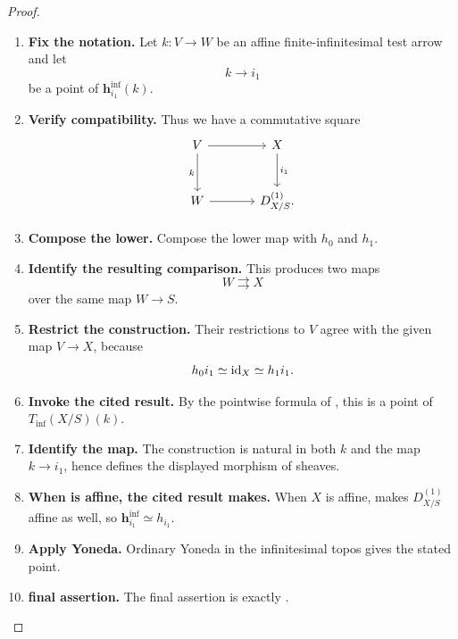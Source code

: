 \begin{proof}
\leavevmode
\begin{enumerate}[label=\textup{(\arabic*)}]
    \item \textbf{Fix the notation.}
    Let \(k:V\to W\) be an affine finite-infinitesimal test arrow and let
    \[
        k\longrightarrow i_1
    \]
    be a point of \(\mathbf h^{\inf}_{i_1}(k)\).

    \item \textbf{Verify compatibility.}
    Thus we have a commutative square
    \[
    \begin{tikzcd}[column sep=large,row sep=large]
        V \arrow[r] \arrow[d,"k"']
            & X \arrow[d,"i_1"]
        \\
        W \arrow[r]
            & D^{(1)}_{X/S}.
    \end{tikzcd}
    \]

    \item \textbf{Compose the lower.}
    Compose the lower map with \(h_0\) and \(h_1\).

    \item \textbf{Identify the resulting comparison.}
    This produces two maps
    \[
        W\rightrightarrows X
    \]
    over the same map \(W\to S\).

    \item \textbf{Restrict the construction.}
    Their restrictions to \(V\) agree with the given map \(V\to X\), because
    \[
        h_0i_1\simeq\operatorname{id}_X\simeq h_1i_1.
    \]

    \item \textbf{Invoke the cited result.}
    By the pointwise formula of , this is a point of
    \(T_{\inf}(X/S)(k)\).

    \item \textbf{Identify the map.}
    The construction is natural in both \(k\) and the map \(k\to i_1\), hence defines the
    displayed morphism of sheaves.

    \item \textbf{When is affine, the cited result makes.}
    When \(X\) is affine,  makes
    \(D^{(1)}_{X/S}\) affine as well, so \(\mathbf h^{\inf}_{i_1}\simeq h_{i_1}\).

    \item \textbf{Apply Yoneda.}
    Ordinary Yoneda in the infinitesimal topos gives the stated point.

    \item \textbf{final assertion.}
    The final assertion is exactly .
\end{enumerate}
\end{proof}


